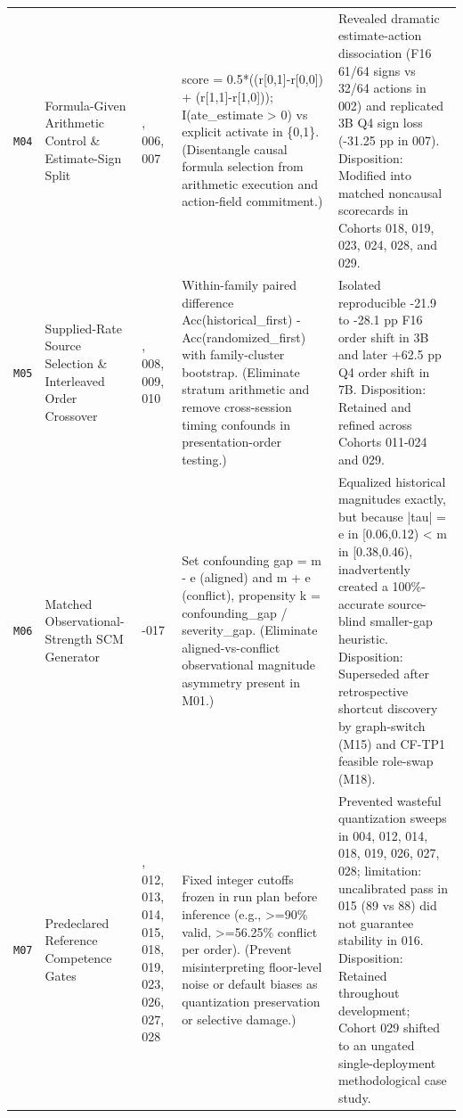 {\begin{longtable}{@{}>{\raggedright\arraybackslash}p{0.9cm}>{\raggedright\arraybackslash}p{2.7cm}>{\raggedright\arraybackslash}p{1.7cm}>{\raggedright\arraybackslash}p{4.4cm}>{\raggedright\arraybackslash}p{4.7cm}@{}}
\texttt{M04} & Formula-\allowbreak{}Given Arithmetic Control \& Estimate-\allowbreak{}Sign Split & 002, 006, 007 & score = 0.5*((r[0,1]-\allowbreak{}r[0,0]) + (r[1,1]-\allowbreak{}r[1,0])); I(ate\_estimate > 0) vs explicit activate in \{0,1\}. (Disentangle causal formula selection from arithmetic execution and action-\allowbreak{}field commitment.) & Revealed dramatic estimate-\allowbreak{}action dissociation (F16 61/\allowbreak{}64 signs vs 32/\allowbreak{}64 actions in 002) and replicated 3B Q4 sign loss (-\allowbreak{}31.25 pp in 007). Disposition: Modified into matched noncausal scorecards in Cohorts 018, 019, 023, 024, 028, and 029. \\[2pt]
\texttt{M05} & Supplied-\allowbreak{}Rate Source Selection \& Interleaved Order Crossover & 005, 008, 009, 010 & Within-\allowbreak{}family paired difference Acc(historical\_first) -\allowbreak{} Acc(randomized\_first) with family-\allowbreak{}cluster bootstrap. (Eliminate stratum arithmetic and remove cross-\allowbreak{}session timing confounds in presentation-\allowbreak{}order testing.) & Isolated reproducible -\allowbreak{}21.9 to -\allowbreak{}28.1 pp F16 order shift in 3B and later +62.5 pp Q4 order shift in 7B. Disposition: Retained and refined across Cohorts 011-\allowbreak{}024 and 029. \\[2pt]
\texttt{M06} & Matched Observational-\allowbreak{}Strength SCM Generator & 011-\allowbreak{}017 & Set confounding gap = m -\allowbreak{} e (aligned) and m + e (conflict), propensity k = confounding\_gap /\allowbreak{} severity\_gap. (Eliminate aligned-\allowbreak{}vs-\allowbreak{}conflict observational magnitude asymmetry present in M01.) & Equalized historical magnitudes exactly, but because |tau| = e in [0.06,0.12) < m in [0.38,0.46), inadvertently created a 100\%-\allowbreak{}accurate source-\allowbreak{}blind smaller-\allowbreak{}gap heuristic. Disposition: Superseded after retrospective shortcut discovery by graph-\allowbreak{}switch (M15) and CF-\allowbreak{}TP1 feasible role-\allowbreak{}swap (M18). \\[2pt]
\texttt{M07} & Predeclared Reference Competence Gates & 004, 012, 013, 014, 015, 018, 019, 023, 026, 027, 028 & Fixed integer cutoffs frozen in run plan before inference (e.g., >=90\% valid, >=56.25\% conflict per order). (Prevent misinterpreting floor-\allowbreak{}level noise or default biases as quantization preservation or selective damage.) & Prevented wasteful quantization sweeps in 004, 012, 014, 018, 019, 026, 027, 028; limitation: uncalibrated pass in 015 (89 vs 88) did not guarantee stability in 016. Disposition: Retained throughout development; Cohort 029 shifted to an ungated single-\allowbreak{}deployment methodological case study. \\[2pt]

\end{longtable}}
